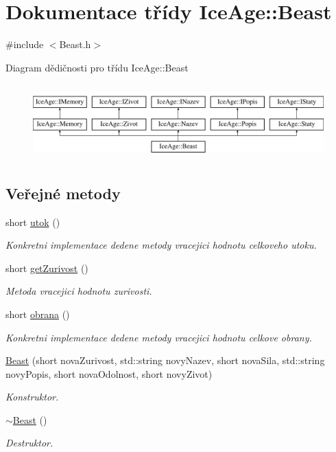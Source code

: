 \hypertarget{classIceAge_1_1Beast}{}\section{Dokumentace třídy Ice\+Age\+:\+:Beast}
\label{classIceAge_1_1Beast}


{\ttfamily \#include $<$Beast.\+h$>$}

Diagram dědičnosti pro třídu Ice\+Age\+:\+:Beast\begin{figure}[H]
\begin{center}
\leavevmode
\includegraphics[height=2.921739cm]{d3/d45/classIceAge_1_1Beast}
\end{center}
\end{figure}
\subsection*{Veřejné metody}
\begin{DoxyCompactItemize}
\item 
short \hyperlink{classIceAge_1_1Beast_aa51303b6d8ff02435b44f566f49c7443}{utok} ()
\begin{DoxyCompactList}\small\item\em Konkretni implementace dedene metody vracejici hodnotu celkoveho utoku. \end{DoxyCompactList}\item 
short \hyperlink{classIceAge_1_1Beast_a5c79a63fbc0a1bb4bcbb9a8dc3f53a6e}{get\+Zurivost} ()
\begin{DoxyCompactList}\small\item\em Metoda vracejici hodnotu zurivosti. \end{DoxyCompactList}\item 
short \hyperlink{classIceAge_1_1Beast_a5968dfee492be5e23cf241306d3dea75}{obrana} ()
\begin{DoxyCompactList}\small\item\em Konkretni implementace dedene metody vracejici hodnotu celkove obrany. \end{DoxyCompactList}\item 
\hyperlink{classIceAge_1_1Beast_ac5cd6bdf15572c9844562995758f0c01}{Beast} (short nova\+Zurivost, std\+::string novy\+Nazev, short nova\+Sila, std\+::string novy\+Popis, short nova\+Odolnost, short novy\+Zivot)
\begin{DoxyCompactList}\small\item\em Konstruktor. \end{DoxyCompactList}\item 
\hyperlink{classIceAge_1_1Beast_a8bf5311c895c575026e812e4b30b6f07}{$\sim$\+Beast} ()
\begin{DoxyCompactList}\small\item\em Destruktor. \end{DoxyCompactList}\end{DoxyCompactItemize}
